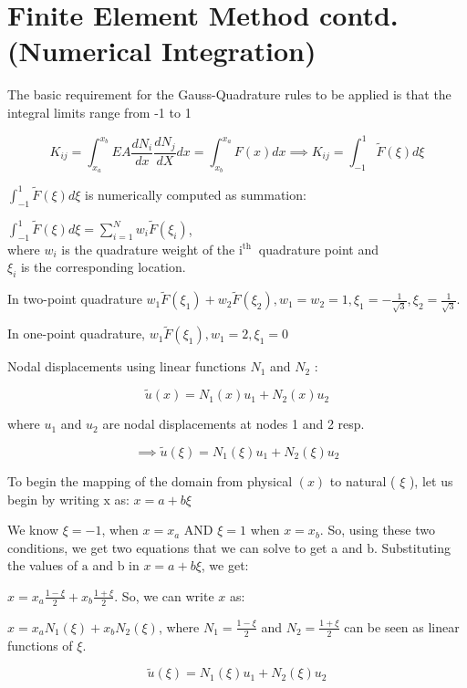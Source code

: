 \documentclass[10pt]{article}
\begin{document}
\newpage
\section{Finite Element Method contd. (Numerical
Integration)}

The basic requirement for the Gauss-Quadrature rules to be applied is that the integral limits range
from -1 to 1

\[
K_{ij} = \int_{x_a}^{x_b} EA \frac{dN_i}{dx} \frac{dN_j}{dX} dx = \int_{x_b}^{x_a} F(x)dx \implies K_{ij} = \int_{-1}^{1} \tilde{F} (\xi) d \xi
\]

$\int_{-1}^{1} \tilde{F}(\xi) d \xi$ is numerically computed as summation:

$\int_{-1}^{1} \tilde{F}(\xi) d \xi=\sum_{i=1}^{N} w_{i} \tilde{F}\left(\xi_{i}\right)$, \\
where $w_{i}$ is the quadrature weight of the $\mathrm{i}^{\text {th }}$ quadrature point and \\ $\xi_{i}$ is the corresponding location.

In two-point quadrature $w_{1} \tilde{F}\left(\xi_{1}\right)+w_{2} \tilde{F}\left(\xi_{2}\right), w_{1}=w_{2}=1, \xi_{1}=-\frac{1}{\sqrt{3}}, \xi_{2}=\frac{1}{\sqrt{3}}$.

In one-point quadrature, $w_{1} \tilde{F}\left(\xi_{1}\right), w_{1}=2, \xi_{1}=0$

Nodal displacements using linear functions $N_{1}$ and $N_{2}$ :

$$
\tilde{u}(x)=N_{1}(x) u_{1}+N_{2}(x) u_{2}
$$

where $u_{1}$ and $u_{2}$ are nodal displacements at nodes 1 and 2 resp.

$$
\implies \tilde{u}(\xi)=N_{1}(\xi) u_{1}+N_{2}(\xi) u_{2}
$$

To begin the mapping of the domain from physical $(x)$ to natural ( $\xi$ ), let us begin by writing $\mathrm{x}$ as: $x=a+b \xi$

We know $\xi=-1$, when $x=x_{a}$ AND $\xi=1$ when $x=x_{b}$. So, using these two conditions, we get two equations that we can solve to get a and $\mathrm{b}$. Substituting the values of $\mathrm{a}$ and $\mathrm{b}$ in $x=a+b \xi$, we get:

$x=x_{a} \frac{1-\xi}{2}+x_{b} \frac{1+\xi}{2}$. So, we can write $x$ as:

$x=x_{a} N_{1}(\xi)+x_{b} N_{2}(\xi)$, where $N_{1}=\frac{1-\xi}{2}$ and $N_{2}=\frac{1+\xi}{2}$ can be seen as linear functions of $\xi$.

$$
\tilde{u}(\xi)=N_{1}(\xi) u_{1}+N_{2}(\xi) u_{2}
$$
\end{document}
